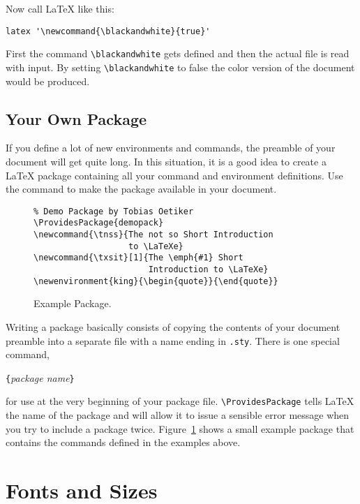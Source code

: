 Now call \LaTeX{} like this:
\begin{verbatim}
latex '\newcommand{\blackandwhite}{true}'
\end{verbatim}

First the command \verb|\blackandwhite| gets defined and then the actual file is read with input.
By setting \verb|\blackandwhite| to false the color version of the document would be produced.

\subsection{Your Own Package}

If you define a lot of new environments and commands, the preamble of
your document will get quite long. In this situation, it is a good
idea to create a \LaTeX{} package containing all your command and
environment definitions. Use the 
command to make the package available in your document.

\begin{figure}[!htbp]
\begin{lined}{\textwidth}
\begin{verbatim}
% Demo Package by Tobias Oetiker
\ProvidesPackage{demopack}
\newcommand{\tnss}{The not so Short Introduction 
                   to \LaTeXe}
\newcommand{\txsit}[1]{The \emph{#1} Short 
                       Introduction to \LaTeXe}
\newenvironment{king}{\begin{quote}}{\end{quote}}
\end{verbatim}
\end{lined}
\caption{Example Package.} \label{package}
\end{figure}

Writing a package basically consists of copying the contents of
your document preamble into a separate file with a name ending in
\texttt{.sty}. There is one special command,
\begin{lscommand}
\verb|{|\emph{package name}\verb|}|
\end{lscommand}
\noindent for use at the very beginning of your package
file. \verb|\ProvidesPackage| tells \LaTeX{} the name of the package
and will allow it to issue a sensible error message when you try to
include a package twice. Figure~\ref{package} shows a small example
package that contains the commands defined in the examples above.

\section{Fonts and Sizes}

